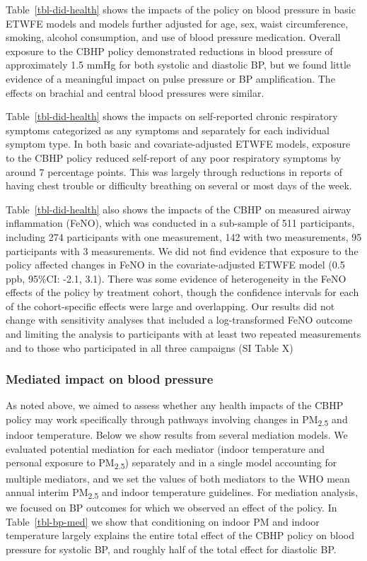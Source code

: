 \documentclass[
  letterpaper,
  DIV=11,
  numbers=noendperiod]{scrartcl}
\begin{document}
Table~\ref{tbl-did-health} shows the impacts of the policy on blood
pressure in basic ETWFE models and models further adjusted for age, sex,
waist circumference, smoking, alcohol consumption, and use of blood
pressure medication. Overall exposure to the CBHP policy demonstrated
reductions in blood pressure of approximately 1.5 mmHg for both systolic
and diastolic BP, but we found little evidence of a meaningful impact on
pulse pressure or BP amplification. The effects on brachial and central
blood pressures were similar.

Table~\ref{tbl-did-health} shows the impacts on self-reported chronic
respiratory symptoms categorized as any symptoms and separately for each
individual symptom type. In both basic and covariate-adjusted ETWFE
models, exposure to the CBHP policy reduced self-report of any poor
respiratory symptoms by around 7 percentage points. This was largely
through reductions in reports of having chest trouble or difficulty
breathing on several or most days of the week.

Table~\ref{tbl-did-health} also shows the impacts of the CBHP on
measured airway inflammation (FeNO), which was conducted in a sub-sample
of 511 participants, including 274 participants with one measurement,
142 with two measurements, 95 participants with 3 measurements. We did
not find evidence that exposure to the policy affected changes in FeNO
in the covariate-adjusted ETWFE model (0.5 ppb, 95\%CI: -2.1, 3.1).
There was some evidence of heterogeneity in the FeNO effects of the
policy by treatment cohort, though the confidence intervals for each of
the cohort-specific effects were large and overlapping. Our results did
not change with sensitivity analyses that included a log-transformed
FeNO outcome and limiting the analysis to participants with at least two
repeated measurements and to those who participated in all three
campaigns (SI Table X)

\hypertarget{mediated-impact-on-blood-pressure}{%
\subsubsection{Mediated impact on blood
pressure}\label{mediated-impact-on-blood-pressure}}

As noted above, we aimed to assess whether any health impacts of the
CBHP policy may work specifically through pathways involving changes in
PM\textsubscript{2.5} and indoor temperature. Below we show results from
several mediation models. We evaluated potential mediation for each
mediator (indoor temperature and personal exposure to
PM\textsubscript{2.5}) separately and in a single model accounting for
multiple mediators, and we set the values of both mediators to the WHO
mean annual interim PM\textsubscript{2.5} and indoor temperature
guidelines. For mediation analysis, we focused on BP outcomes for which
we observed an effect of the policy. In Table~\ref{tbl-bp-med} we show
that conditioning on indoor PM and indoor temperature largely explains
the entire total effect of the CBHP policy on blood pressure for
systolic BP, and roughly half of the total effect for diastolic BP.
\end{document}
